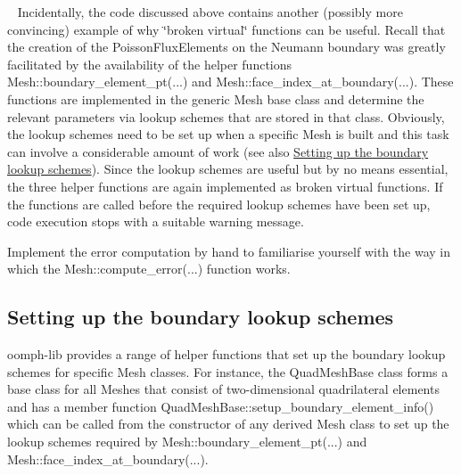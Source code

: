 \begin{DoxyEnumerate}
\begin{longtabu}
 ~\newline
 Incidentally, the code discussed above contains another (possibly more convincing) example of why \char`\"{}broken virtual\char`\"{} functions can be useful. Recall that the creation of the {\ttfamily Poisson\+Flux\+Elements} on the Neumann boundary was greatly facilitated by the availability of the helper functions {\ttfamily Mesh\+::boundary\+\_\+element\+\_\+pt}(...) and {\ttfamily Mesh\+::face\+\_\+index\+\_\+at\+\_\+boundary}(...). These functions are implemented in the generic {\ttfamily Mesh} base class and determine the relevant parameters via lookup schemes that are stored in that class. Obviously, the lookup schemes need to be set up when a specific {\ttfamily Mesh} is built and this task can involve a considerable amount of work (see also \hyperlink{index_footnote}{Setting up the boundary lookup schemes}). Since the lookup schemes are useful but by no means essential, the three helper functions are again implemented as broken virtual functions. If the functions are called before the required lookup schemes have been set up, code execution stops with a suitable warning message.   \\
\end{longtabu}

\item Implement the error computation by hand to familiarise yourself with the way in which the {\ttfamily Mesh\+::compute\+\_\+error}(...) function works.
\end{DoxyEnumerate}



 \hypertarget{index_footnote}{}\subsection{Setting up the boundary lookup schemes}\label{index_footnote}
{\ttfamily oomph-\/lib} provides a range of helper functions that set up the boundary lookup schemes for specific {\ttfamily Mesh} classes. For instance, the {\ttfamily Quad\+Mesh\+Base} class forms a base class for all {\ttfamily Meshes} that consist of two-\/dimensional quadrilateral elements and has a member function {\ttfamily Quad\+Mesh\+Base\+::setup\+\_\+boundary\+\_\+element\+\_\+info()} which can be called from the constructor of any derived {\ttfamily Mesh} class to set up the lookup schemes required by {\ttfamily Mesh\+::boundary\+\_\+element\+\_\+pt}(...) and {\ttfamily Mesh\+::face\+\_\+index\+\_\+at\+\_\+boundary}(...).



